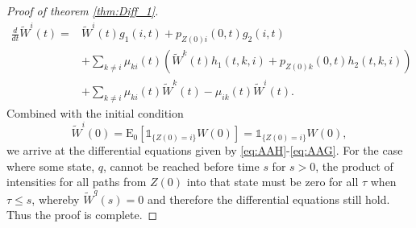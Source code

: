 \documentclass[12pt]{article}
\newcommand{\E}{\text{E}}
\newcommand{\indic}[1]{\mathds{1}_{ \{ #1 \} }}
\theoremstyle{my_thm}
\begin{document}
\begin{proof}[Proof of theorem \ref{thm:Diff_1}]
\begin{align*}
\frac{d}{dt}\tilde{W}^i(t)=&
 \tilde{W}^i(t)g_1(i,t)+p_{Z(0)i}(0,t)g_2(i,t)\\
&+
\sum_{k \neq i} \mu_{ki}(t) \left( \tilde{W}^k(t) h_1(t,k,i) + p_{Z(0)k}(0,t)h_2(t,k,i) \right)
\\
&+
\sum_{k \neq i} \mu_{ki}(t) \tilde{W}^k(t)-\mu_{ik}(t)\tilde{W}^i(t).
\end{align*}
Combined with the initial condition
$$
\tilde{W}^i(0)=\E_0[\indic{Z(0)=i}W(0)]=\indic{Z(0)=i}W(0),
$$
we arrive at the differential equations given by \eqref{eq:AAH}-\eqref{eq:AAG}. For the case where some state, $q$, cannot be reached before time $s$ for $s>0$, the product of intensities for all paths from $Z(0)$ into that state must be zero for all $\tau$ when $\tau \leq s$, whereby $\tilde{W}^q(s)=0$ and therefore the differential equations still hold. Thus the proof is complete.
\end{proof}
\end{document}
